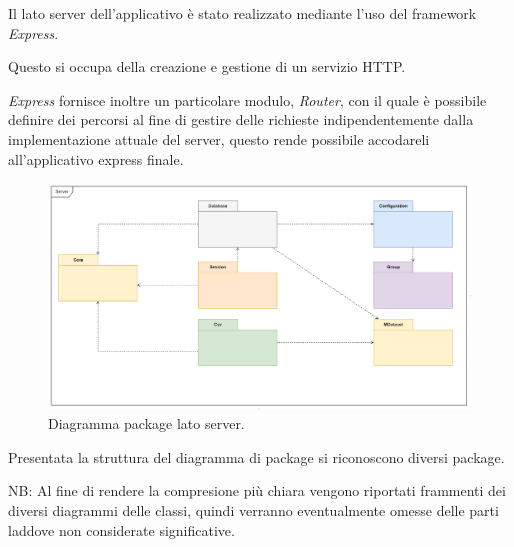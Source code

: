 \documentclass[../manuale_sviluppatore.tex]{subfiles}
\begin{document}
Il lato server dell'applicativo è stato realizzato mediante l'uso del framework \emph{Express}.

Questo si occupa della creazione e gestione di un servizio HTTP. 

\emph{Express} fornisce inoltre un particolare modulo, \emph{Router}, con il quale è possibile definire dei percorsi 
al fine di gestire delle richieste indipendentemente dalla implementazione attuale del server, questo rende possibile
accodareli all'applicativo express finale.

\begin{figure}[H]
	\centering
	\includegraphics[width=18cm]{img/package-server.png}
	\caption{Diagramma package lato server.}
\end{figure}

\par Presentata la struttura del diagramma di package si riconoscono diversi package.

NB: Al fine di rendere la compresione più chiara vengono riportati frammenti dei diversi diagrammi delle classi, 
quindi verranno eventualmente omesse delle parti laddove non considerate significative.
\end{document}
